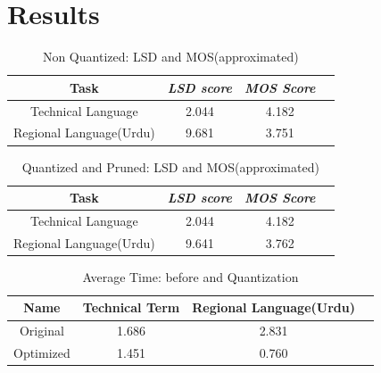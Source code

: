 \documentclass[conference]{IEEEtran}
\begin{document}
\section{Results}
\begin{table}[htbp]
\caption{Non Quantized: LSD and MOS(approximated)}
\begin{center}
\begin{tabular}{|c|c|c|c|}
\hline
\textbf{Task} & \textbf{\textit{LSD score}}& \textbf{\textit{MOS Score}}\\
\hline
Technical Language & 2.044 & 4.182\\
Regional Language(Urdu) & 9.681 & 3.751\\
\hline
\end{tabular}
\label{tab1}
\end{center}
\end{table}

\begin{table}[htbp]
\caption{Quantized and Pruned: LSD and MOS(approximated)}
\begin{center}
\begin{tabular}{|c|c|c|c|}
\hline
\textbf{Task} & \textbf{\textit{LSD score}}& \textbf{\textit{MOS Score}}\\
\hline
Technical Language & 2.044 & 4.182\\
Regional Language(Urdu) & 9.641 & 3.762\\
\hline
\end{tabular}
\label{tab1}
\end{center}
\end{table}

\begin{table}[htbp]
\caption{Average Time: before and Quantization}
\begin{center}
\begin{tabular}{|c|c|c|c|}
\hline
\textbf{Name} & \textbf{Technical Term} & \textbf{Regional Language(Urdu)} \\
\hline
Original  & 1.686 & 2.831 \\
\hline
Optimized & 1.451 & 0.760 \\
\hline
\end{tabular}
\label{tab1}
\end{center}
\end{table}
\end{document}
